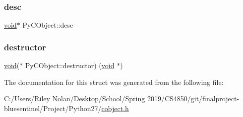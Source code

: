 \subsubsection{\texorpdfstring{desc}{desc}}
{\footnotesize\ttfamily \mbox{\hyperlink{_s_d_l__opengles2__gl2ext_8h_ae5d8fa23ad07c48bb609509eae494c95}{void}}$\ast$ Py\+C\+Object\+::desc}

\mbox{\label{struct_py_c_object_aabeacd210067fddb5b0d328269326d0d}} 
\subsubsection{\texorpdfstring{destructor}{destructor}}
{\footnotesize\ttfamily \mbox{\hyperlink{_s_d_l__opengles2__gl2ext_8h_ae5d8fa23ad07c48bb609509eae494c95}{void}}($\ast$ Py\+C\+Object\+::destructor) (\mbox{\hyperlink{_s_d_l__opengles2__gl2ext_8h_ae5d8fa23ad07c48bb609509eae494c95}{void}} $\ast$)}



The documentation for this struct was generated from the following file\+:\begin{DoxyCompactItemize}
\item 
C\+:/\+Users/\+Riley Nolan/\+Desktop/\+School/\+Spring 2019/\+C\+S4850/git/finalproject-\/bluesentinel/\+Project/\+Python27/\mbox{\hyperlink{cobject_8h}{cobject.\+h}}\end{DoxyCompactItemize}
